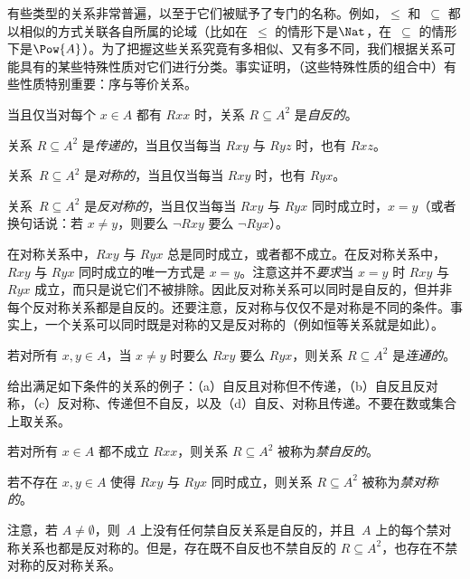 \documentclass[../../../include/open-logic-section]{subfiles}
\begin{document}

\begin{intro}
有些类型的关系非常普遍，以至于它们被赋予了专门的名称。例如，$\le$ 和~$\subseteq$ 都以相似的方式关联各自所属的论域（比如在~$\le$ 的情形下是$\Nat$，在~$\subseteq$ 的情形下是$\Pow{A}$）。为了把握这些关系究竟有多相似、又有多不同，我们根据关系可能具有的某些特殊性质对它们进行分类。事实证明，（这些特殊性质的组合中）有些性质特别重要：序与等价关系。
\end{intro}

\begin{defn}[自反性]
当且仅当对每个 $x \in A$ 都有 $Rxx$ 时，关系 $R \subseteq A^2$ 是\emph{自反的}。
\end{defn}

\begin{defn}[传递性]
关系 $R \subseteq A^2$ 是\emph{传递的}，当且仅当每当 $Rxy$ 与 $Ryz$ 时，也有 $Rxz$。
\end{defn}

\begin{defn}[对称性]
关系~$R \subseteq A^2$ 是\emph{对称的}，当且仅当每当 $Rxy$ 时，也有 $Ryx$。
\end{defn}

\begin{defn}[反对称性]
关系~$R \subseteq A^2$ 是\emph{反对称的}，当且仅当每当 $Rxy$ 与 $Ryx$ 同时成立时，$x=y$（或者换句话说：若 $x\neq y$，则要么 $\lnot Rxy$ 要么 $\lnot Ryx$）。
\end{defn}

\begin{explain}
在对称关系中，$Rxy$ 与 $Ryx$ 总是同时成立，或者都不成立。在反对称关系中，$Rxy$ 与 $Ryx$ 同时成立的唯一方式是 $x = y$。注意这并不\emph{要求}当 $x = y$ 时 $Rxy$ 与 $Ryx$ 成立，而只是说它们不被排除。因此反对称关系可以同时是自反的，但并非每个反对称关系都是自反的。还要注意，反对称与仅仅不是对称是不同的条件。事实上，一个关系可以同时既是对称的又是反对称的（例如恒等关系就是如此）。
\end{explain}

\begin{defn}[连通性]
若对所有 $x,y\in A$，当 $x \neq y$ 时要么 $Rxy$ 要么 $Ryx$，则关系 $R \subseteq A^2$ 是\emph{连通的}。
\end{defn}

\begin{prob}
给出满足如下条件的关系的例子：（a）自反且对称但不传递，（b）自反且反对称，（c）反对称、传递但不自反，以及（d）自反、对称且传递。不要在数或集合上取关系。
\end{prob}

\begin{defn}[禁自反性]
若对所有 $x \in A$ 都不成立 $Rxx$，则关系 $R \subseteq A^2$ 被称为\emph{禁自反的}。
\end{defn}

\begin{defn}[禁对称性]
若不存在 $x,y\in A$ 使得 $Rxy$ 与 $Ryx$ 同时成立，则关系 $R \subseteq A^2$ 被称为\emph{禁对称的}。
\end{defn}

注意，若 $A \neq \emptyset$，则~$A$ 上没有任何禁自反关系是自反的，并且~$A$ 上的每个禁对称关系也都是反对称的。但是，存在既不自反也不禁自反的 $R \subseteq A^2$，也存在不禁对称的反对称关系。
\end{document}
